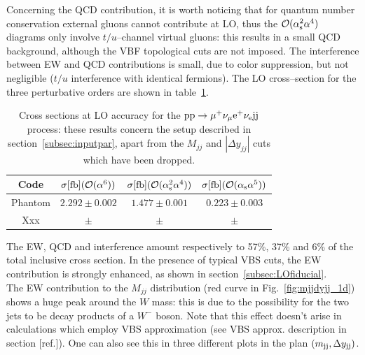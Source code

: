Concerning the QCD contribution, it is worth noticing that for quantum number conservation external gluons cannot contribute at LO, thus the $\mathcal{O}(\alpha_\text{s}^2\alpha^4)$ diagrams only involve $t/u$--channel virtual gluons: this results in a small QCD background, although the VBF topological cuts are not imposed. The interference between EW and QCD contributions is small, due to color suppression, but not negligible ($t/u$ interference with identical fermions). The LO cross--section for the three perturbative orders are shown in table~\ref{tab:LOscanXsec}.
\begin{table}[h!]
    \centering
    \begin{tabular}{c|c|c|c}
        Code  &  $\sigma[\rm{fb}] (\mathcal{O}(\alpha^6))$ & $\sigma[\rm{fb}] (\mathcal{O}(\alpha_\text{s}^2\alpha^4))$ & $\sigma[\rm{fb}] (\mathcal{O}(\alpha_\text{s}\alpha^5))$ \\
        \hline
        \hline
        {\sc Phantom}  &  $ 2.292 \pm 0.002 $ & $ 1.477 \pm 0.001 $ & $ 0.223 \pm 0.003 $ \\
        {\sc Xxx}&  $ \pm $ & $ \pm $ & $ \pm $
    \end{tabular}
    \caption{\label{tab:LOscanXsec} Cross sections at LO accuracy for the ${\rm p}{\rm p}\to\mu^+\nu_\mu{\rm e}^+\nu_{\rm e}{\rm j}{\rm j}$ process: these results concern the setup described in section~\ref{subsec:inputpar}, apart from the $M_{jj}$ and $|\Delta y_{jj}|$ cuts which have been dropped.}
\end{table}
The EW, QCD and interference amount respectively to 57\%, 37\% and 6\% of the total inclusive cross section. In the presence of typical VBS cuts, the EW contribution is strongly enhanced, as shown in section~\ref{subsec:LOfiducial}.\\
The EW contribution to the $M_{jj}$ distribution (red curve in Fig.~\ref{fig:mjjdyjj_1d}) shows a huge peak around the $W$ mass: this is due to the possibility for the two jets to be decay products of a $W^-$ boson. Note that this effect doesn't arise in calculations which employ VBS approximation (see VBS approx. description in section [ref.]).
One can also see this in three different plots in the plan $\left(m_{\text{j}\text{j}}, \Delta y_{\text{j}\text{j}}\right)$.

